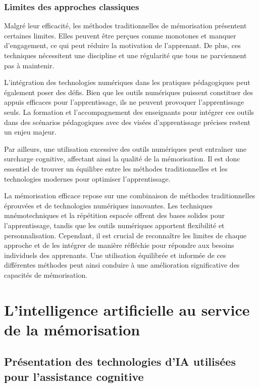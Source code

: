 \documentclass[12pt,a4paper]{report}
\begin{document}
\subsection{Limites des approches classiques}

Malgré leur efficacité, les méthodes traditionnelles de mémorisation présentent certaines limites. Elles peuvent être perçues comme monotones et manquer d'engagement, ce qui peut réduire la motivation de l'apprenant. De plus, ces techniques nécessitent une discipline et une régularité que tous ne parviennent pas à maintenir.

L'intégration des technologies numériques dans les pratiques pédagogiques peut également poser des défis. Bien que les outils numériques puissent constituer des appuis efficaces pour l'apprentissage, ils ne peuvent provoquer l'apprentissage seuls. La formation et l'accompagnement des enseignants pour intégrer ces outils dans des scénarios pédagogiques avec des visées d'apprentissage précises restent un enjeu majeur. \cite{res-canope}

Par ailleurs, une utilisation excessive des outils numériques peut entraîner une surcharge cognitive, affectant ainsi la qualité de la mémorisation. Il est donc essentiel de trouver un équilibre entre les méthodes traditionnelles et les technologies modernes pour optimiser l'apprentissage.

La mémorisation efficace repose sur une combinaison de méthodes traditionnelles éprouvées et de technologies numériques innovantes. Les techniques mnémotechniques et la répétition espacée offrent des bases solides pour l'apprentissage, tandis que les outils numériques apportent flexibilité et personnalisation. Cependant, il est crucial de reconnaître les limites de chaque approche et de les intégrer de manière réfléchie pour répondre aux besoins individuels des apprenants. Une utilisation équilibrée et informée de ces différentes méthodes peut ainsi conduire à une amélioration significative des capacités de mémorisation.

\newpage

\chapter{L'intelligence artificielle au service de la mémorisation}

\section{Présentation des technologies d'IA utilisées pour l'assistance cognitive}
\end{document}
